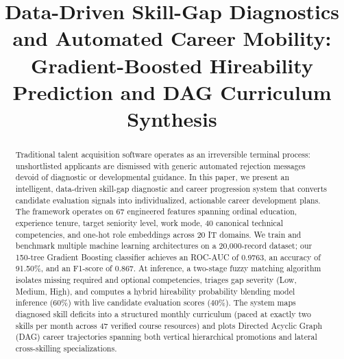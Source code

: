 \documentclass[conference]{IEEEtran}
\begin{document}
\title{Data-Driven Skill-Gap Diagnostics and Automated Career Mobility: Gradient-Boosted Hireability Prediction and DAG Curriculum Synthesis}

\author{
}

\maketitle

\begin{abstract}
Traditional talent acquisition software operates as an irreversible terminal process: unshortlisted applicants are dismissed with generic automated rejection messages devoid of diagnostic or developmental guidance. In this paper, we present an intelligent, data-driven skill-gap diagnostic and career progression system that converts candidate evaluation signals into individualized, actionable career development plans. The framework operates on 67 engineered features spanning ordinal education, experience tenure, target seniority level, work mode, 40 canonical technical competencies, and one-hot role embeddings across 20 IT domains. We train and benchmark multiple machine learning architectures on a 20,000-record dataset; our 150-tree Gradient Boosting classifier achieves an ROC-AUC of 0.9763, an accuracy of 91.50\%, and an F1-score of 0.867. At inference, a two-stage fuzzy matching algorithm isolates missing required and optional competencies, triages gap severity (Low, Medium, High), and computes a hybrid hireability probability blending model inference ($60\%$) with live candidate evaluation scores ($40\%$). The system maps diagnosed skill deficits into a structured monthly curriculum (paced at exactly two skills per month across 47 verified course resources) and plots Directed Acyclic Graph (DAG) career trajectories spanning both vertical hierarchical promotions and lateral cross-skilling specializations.
\end{abstract}
\end{document}
